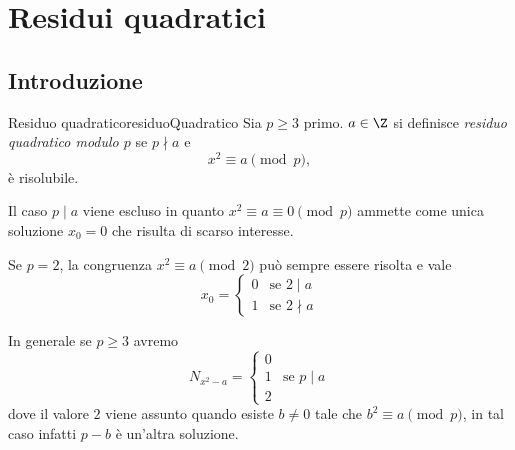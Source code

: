 %
%
\chapter{Residui quadratici}
\section{Introduzione}

\begin{defn}{Residuo quadratico}{residuoQuadratico}
	Sia \(p \ge 3\) primo.
	\(a\in\Z\) si definisce \emph{residuo quadratico modulo \(p\)} se \(p\nmid a\) e
	\[
		x^2 \equiv a \pmod{p},
	\]
	è risolubile.
\end{defn}

\begin{oss}
	Il caso \(p\mid a\) viene escluso in quanto \(x^2 \equiv a \equiv 0 \pmod{p}\) ammette come unica soluzione \(x_0 = 0\) che risulta di scarso interesse.
\end{oss}

\begin{oss}
	Se \(p = 2\), la congruenza \(x^2 \equiv a \pmod{2}\) può sempre essere risolta e vale
	\[
		x_0 = 	\begin{cases}
			0 & \text{se }2\mid a  \\
			1 & \text{se }2\nmid a
		\end{cases}
	\]
\end{oss}

\begin{oss}
	In generale se \(p\ge 3\) avremo
	\[
		N_{x^2-a} = 	\begin{cases}
			0                     \\
			1 & \text{se }p\mid a \\
			2
		\end{cases}
	\]
	dove il valore \(2\) viene assunto quando esiste \(b\neq 0\) tale che \(b^2 \equiv a \pmod{p}\), in tal caso infatti \(p-b\) è un'altra soluzione.
\end{oss}

